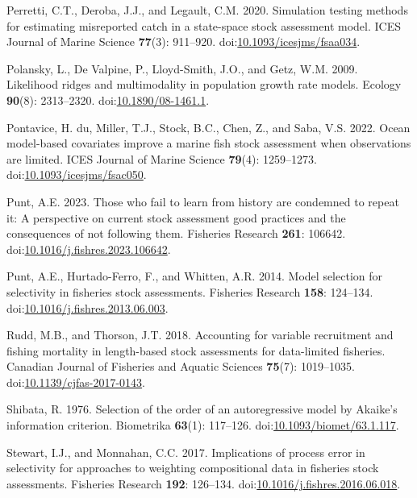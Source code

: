 \documentclass[
  12pt,
]{article}
\newlength{\cslhangindent}
\newenvironment{CSLReferences}[2] %
 {\begin{list}{}{%
  \setlength{\itemindent}{0pt}
  \setlength{\leftmargin}{0pt}
  \setlength{\parsep}{0pt}
  \ifodd #1
   \setlength{\leftmargin}{\cslhangindent}
   \setlength{\itemindent}{-1\cslhangindent}
  \fi
  \setlength{\itemsep}{#2\baselineskip}}}
 {\end{list}}
\begin{document}
\begin{CSLReferences}{1}{0}
Perretti, C.T., Deroba, J.J., and Legault, C.M. 2020. Simulation testing
methods for estimating misreported catch in a state-space stock
assessment model. ICES Journal of Marine Science \textbf{77}(3):
911--920.
doi:\href{https://doi.org/10.1093/icesjms/fsaa034}{10.1093/icesjms/fsaa034}.

Polansky, L., De Valpine, P., Lloyd-Smith, J.O., and Getz, W.M. 2009.
Likelihood ridges and multimodality in population growth rate models.
Ecology \textbf{90}(8): 2313--2320.
doi:\href{https://doi.org/10.1890/08-1461.1}{10.1890/08-1461.1}.

Pontavice, H. du, Miller, T.J., Stock, B.C., Chen, Z., and Saba, V.S.
2022. Ocean model-based covariates improve a marine fish stock
assessment when observations are limited. ICES Journal of Marine Science
\textbf{79}(4): 1259--1273.
doi:\href{https://doi.org/10.1093/icesjms/fsac050}{10.1093/icesjms/fsac050}.

Punt, A.E. 2023. Those who fail to learn from history are condemned to
repeat it: A perspective on current stock assessment good practices and
the consequences of not following them. Fisheries Research \textbf{261}:
106642.
doi:\href{https://doi.org/10.1016/j.fishres.2023.106642}{10.1016/j.fishres.2023.106642}.

Punt, A.E., Hurtado-Ferro, F., and Whitten, A.R. 2014. Model selection
for selectivity in fisheries stock assessments. Fisheries Research
\textbf{158}: 124--134.
doi:\href{https://doi.org/10.1016/j.fishres.2013.06.003}{10.1016/j.fishres.2013.06.003}.

Rudd, M.B., and Thorson, J.T. 2018. Accounting for variable recruitment
and fishing mortality in length-based stock assessments for data-limited
fisheries. Canadian Journal of Fisheries and Aquatic Sciences
\textbf{75}(7): 1019--1035.
doi:\href{https://doi.org/10.1139/cjfas-2017-0143}{10.1139/cjfas-2017-0143}.

Shibata, R. 1976. Selection of the order of an autoregressive model by
{A}kaike's information criterion. Biometrika \textbf{63}(1): 117--126.
doi:\href{https://doi.org/10.1093/biomet/63.1.117}{10.1093/biomet/63.1.117}.

Stewart, I.J., and Monnahan, C.C. 2017. Implications of process error in
selectivity for approaches to weighting compositional data in fisheries
stock assessments. Fisheries Research \textbf{192}: 126--134.
doi:\href{https://doi.org/10.1016/j.fishres.2016.06.018}{10.1016/j.fishres.2016.06.018}.


\end{CSLReferences}
\end{document}

